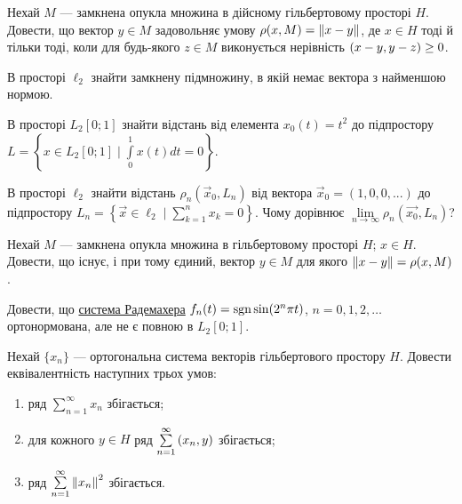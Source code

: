 \begin{exercise}
    Нехай $M$ --- замкнена опукла множина в дійсному гільбертовому просторі $H$.
    Довести, що вектор $y \in M$ задовольняє умову $\rho(x, M) = \left\lVert x-y\right\rVert$,
    де $x \in H$ тоді й тільки тоді, коли для будь-якого $z \in M$ виконується
    нерівність $\left(x-y, y-z\right) \geq 0$.
\end{exercise}

\begin{exercise}\label{N:1_2_21}
    В просторі $\ell_2$ знайти замкнену підмножину, в якій немає вектора з найменшою нормою.
\end{exercise}

\begin{exercise}
    В просторі $L_2[0;1]$ знайти відстань від елемента $x_0(t) = t^2$ до підпростору
    $L = \left\{x \in L_2[0;1] \mid \int\limits_0^1x(t)dt = 0\right\}$.
\end{exercise}

\begin{exercise}
    В просторі $\ell_2$ знайти відстань $\rho_n(\vec{x}_0, L_n)$ від вектора $\vec{x}_0 = (1, 0, 0, ...)$ до
    підпростору $L_n = \left\{ \vec{x}\in \ell_2 \mid \sum\limits^n_{k=1} x_k = 0\right\}$.
    Чому дорівнює $\lim\limits_{n \to \infty} \rho_n(\vec{x_0}, L_n)$?
\end{exercise}

\begin{exercise}\label{N:1_2_24}
    Нехай $M$ --- замкнена опукла множина в гільбертовому просторі $H$; $x \in H$.
    Довести, що існує, і при тому єдиний, вектор $y \in M$ для якого $\left\lVert x-y\right\rVert =
    \rho(x, M)$.
\end{exercise}

\begin{exercise}
    Довести, що \underline{система Радемахера} $f_n(t) = \operatorname{sgn}\sin(2^n \pi t)$,
    $n=0,1,2,\dots$ ортонормована, але не є повною в $L_2[0;1]$.
\end{exercise}

\begin{exercise}\label{N:1_2_26}
    Нехай $\{x_n\}$ --- ортогональна система векторів гільбертового простору $H$.
    Довести еквівалентність наступних трьох умов:
    \begin{enumerate}[label=\ukr*)]
        \item ряд $\sum\limits^\infty_{n=1} x_n$ збігається;
        \item для кожного $y \in H$ ряд $\sum\limits^\infty_{n=1} \left(x_n, y\right)$ збігається;
        \item ряд $\sum\limits^\infty_{n=1} \left\lVert x_n\right\rVert^2$ збігається.
    \end{enumerate}
\end{exercise}

